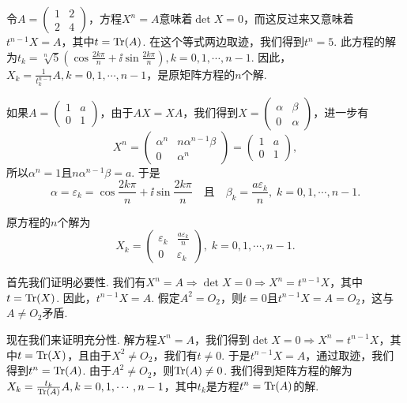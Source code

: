 \begin{solution}
  令$A=\begin{pmatrix}
    1 & 2 \\
    2 & 4
  \end{pmatrix}$，方程$X^n=A$意味着$\det X=0$，而这反过来又意味着$t^{n-1}X=A$，其中$t=\operatorname{Tr}(A)$. 在这个等式两边取迹，我们得到$t^n=5$. 此方程的解为$t_k=\sqrt[n]5\left(\cos\frac{2k\pi}n+\ii\sin
  \frac{2k\pi}n\right),k=0,1,\cdots,n-1$. 因此，$X_k=\frac1{t_k^{n-1}}A,k=0,1,\cdots,n-1$，是原矩阵方程的$n$个解.
\end{solution}

\begin{solution}
  如果$A=\begin{pmatrix}
    1 & a \\
    0 & 1
  \end{pmatrix}$，由于$AX=XA$，我们得到$X=\begin{pmatrix}
    \alpha & \beta \\
    0 & \alpha
  \end{pmatrix}$，进一步有
  \[
    X^n = \begin{pmatrix}
      \alpha^n & n\alpha^{n-1}\beta \\
      0 & \alpha^n
    \end{pmatrix} =
    \begin{pmatrix}
      1 & a \\
      0 & 1
    \end{pmatrix},
  \]
  所以$\alpha^n=1$且$n\alpha^{n-1}\beta=a$. 于是
  \[
    \alpha = \varepsilon_k = \cos\frac{2k\pi}n + \ii\sin \frac{2k\pi}n\quad \text{且} \quad
    \beta_k = \frac{a\varepsilon_k}n,\;k=0,1,\cdots,n-1.
  \]

  原方程的$n$个解为
  \[
    X_k = \begin{pmatrix}
      \varepsilon_k & \frac{a\varepsilon_k}n \\
      0 & \varepsilon_k
    \end{pmatrix},\;k=0,1,\cdots,n-1.
  \]
\end{solution}

\begin{solution}
  首先我们证明必要性. 我们有$X^n=A\Rightarrow\det X=0\Rightarrow X^n=t^{n-1}X$，其中$t=\operatorname{Tr}(X)$. 因此，$t^{n-1}X=A$. 假定$A^2=O_2$，则$t=0$且$t^{n-1}X=A=O_2$，这与$A\ne O_2$矛盾.

  现在我们来证明充分性. 解方程$X^n=A$，我们得到$\det X=0\Rightarrow X^n=t^{n-1}X$，其中$t=\operatorname{Tr}(X)$，且由于$X^2\ne O_2$，我们有$t\ne0$. 于是$t^{n-1}X=A$，通过取迹，我们得到$t^n=\operatorname{Tr}(A)$. 由于$A^2\ne O_2$，则$\operatorname{Tr}(A)\ne0$. 我们得到矩阵方程的解为$X_k=\frac{t_k}{\operatorname{Tr}(A)}A,k=0,1,\cdots,n-1$，其中$t_k$是方程$t^n=\operatorname{Tr}(A)$的解.
\end{solution}

